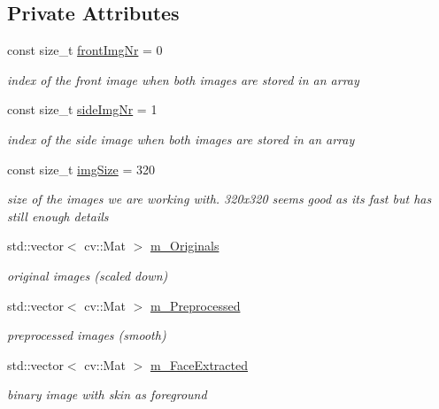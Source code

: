 \subsection*{Private Attributes}
\begin{DoxyCompactItemize}
\item 
const size\+\_\+t \hyperlink{class_face3_d_1_1_detection_a1c1137f1d9972fd213a04f93084a0d5c}{front\+Img\+Nr} = 0
\begin{DoxyCompactList}\small\item\em index of the front image when both images are stored in an array \end{DoxyCompactList}\item 
const size\+\_\+t \hyperlink{class_face3_d_1_1_detection_a7a2e671e0ba9133f1fd8e877bc5a89f9}{side\+Img\+Nr} = 1
\begin{DoxyCompactList}\small\item\em index of the side image when both images are stored in an array \end{DoxyCompactList}\item 
const size\+\_\+t \hyperlink{class_face3_d_1_1_detection_a7d9ef90ae57f59f0e73edec0dffd9bd7}{img\+Size} = 320
\begin{DoxyCompactList}\small\item\em size of the images we are working with. 320x320 seems good as its fast but has still enough details \end{DoxyCompactList}\item 
std\+::vector$<$ cv\+::\+Mat $>$ \hyperlink{class_face3_d_1_1_detection_a237f409f79b8417f906732dc522322a8}{m\+\_\+\+Originals}
\begin{DoxyCompactList}\small\item\em original images (scaled down) \end{DoxyCompactList}\item 
std\+::vector$<$ cv\+::\+Mat $>$ \hyperlink{class_face3_d_1_1_detection_a022bcdfdcfab58bcd2bb4f448d583b3c}{m\+\_\+\+Preprocessed}
\begin{DoxyCompactList}\small\item\em preprocessed images (smooth) \end{DoxyCompactList}\item 
std\+::vector$<$ cv\+::\+Mat $>$ \hyperlink{class_face3_d_1_1_detection_a835e20dfe0fc3c9cee63168c4467dd82}{m\+\_\+\+Face\+Extracted}
\begin{DoxyCompactList}\small\item\em binary image with skin as foreground \end{DoxyCompactList}\item 

\end{DoxyCompactItemize}
